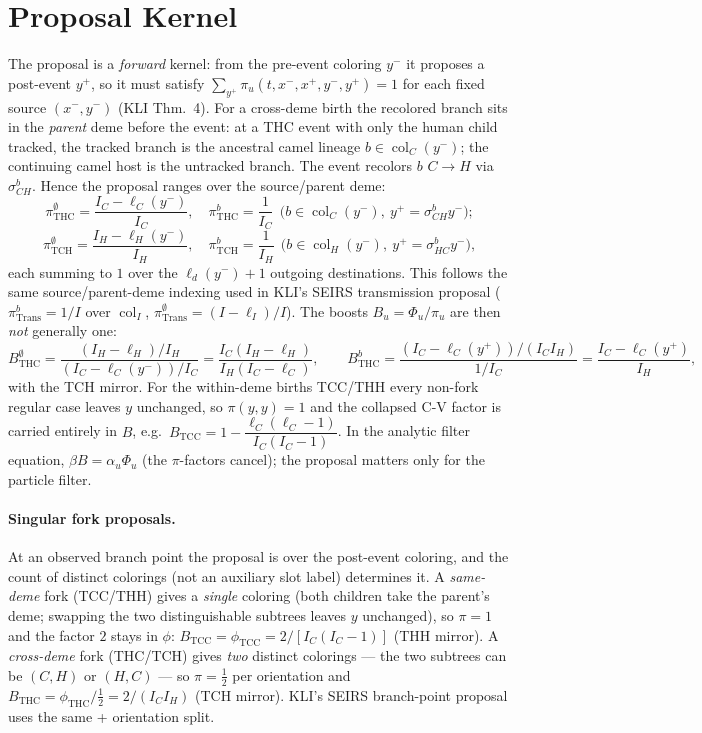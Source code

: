 \documentclass[11pt]{article}
\newcommand{\col}{\operatorname{col}}
\theoremstyle{plain}
\begin{document}
\section{Proposal Kernel}
The proposal is a \emph{forward} kernel: from the pre-event coloring $y^-$ it proposes a post-event
$y^+$, so it must satisfy $\sum_{y^+}\pi_u(t,x^-,x^+,y^-,y^+)=1$ for each fixed source $(x^-,y^-)$ (KLI
Thm.~4). For a cross-deme birth the recolored branch sits in the \emph{parent} deme before the event:
at a THC event with only the human child tracked, the tracked branch is the ancestral camel lineage
$b\in\col_C(y^-)$; the continuing camel host is the untracked branch. The event recolors $b$ $C\to H$ via $\sigma^b_{CH}$. Hence the proposal ranges over the source/parent deme:
\[
\pi^\emptyset_{\mathrm{THC}}=\frac{I_C-\ell_C(y^-)}{I_C},\quad
\pi^b_{\mathrm{THC}}=\frac{1}{I_C}\ \ \bigl(b\in\col_C(y^-),\ y^+=\sigma^b_{CH}y^-\bigr);
\]
\[
\pi^\emptyset_{\mathrm{TCH}}=\frac{I_H-\ell_H(y^-)}{I_H},\quad
\pi^b_{\mathrm{TCH}}=\frac{1}{I_H}\ \ \bigl(b\in\col_H(y^-),\ y^+=\sigma^b_{HC}y^-\bigr),
\]
each summing to $1$ over the $\ell_d(y^-)+1$ outgoing destinations. This follows the same source/parent-deme indexing used in KLI's SEIRS transmission proposal ($\pi^b_{\mathrm{Trans}}=1/I$ over $\col_I$, $\pi^\emptyset_{\mathrm{Trans}}=(I-\ell_I)/I$). The boosts $B_u=\Phi_u/\pi_u$ are
then \emph{not} generally one:
\[
B^\emptyset_{\mathrm{THC}}=\frac{(I_H-\ell_H)/I_H}{(I_C-\ell_C(y^-))/I_C}=\frac{I_C(I_H-\ell_H)}{I_H(I_C-\ell_C)},
\qquad
B^b_{\mathrm{THC}}=\frac{(I_C-\ell_C(y^+))/(I_CI_H)}{1/I_C}=\frac{I_C-\ell_C(y^+)}{I_H},
\]
with the TCH mirror. For the within-deme births TCC/THH every non-fork regular case leaves $y$
unchanged, so $\pi(y,y)=1$ and the collapsed C-V factor is carried entirely in $B$, e.g.\
$B_{\mathrm{TCC}}=1-\dfrac{\ell_C(\ell_C-1)}{I_C(I_C-1)}$. In the analytic filter equation, $\beta B=\alpha_u\Phi_u$
(the $\pi$-factors cancel); the proposal matters only for the particle filter.

\paragraph{Singular fork proposals.} At an observed branch point the proposal is over the post-event
coloring, and the count of distinct colorings (not an auxiliary slot label) determines it. A
\emph{same-deme} fork (TCC/THH) gives a \emph{single} coloring (both children take the parent's deme;
swapping the two distinguishable subtrees leaves $y$ unchanged), so $\pi=1$ and the factor $2$ stays in
$\phi$: $B_{\mathrm{TCC}}=\phi_{\mathrm{TCC}}=2/[I_C(I_C-1)]$ (THH mirror). A \emph{cross-deme} fork
(THC/TCH) gives \emph{two} distinct colorings --- the two subtrees can be $(C,H)$ or $(H,C)$ --- so
$\pi=\tfrac12$ per orientation and $B_{\mathrm{THC}}=\phi_{\mathrm{THC}}/\tfrac12=2/(I_CI_H)$ (TCH
mirror). KLI's SEIRS branch-point proposal uses the same \textonehalf{}+\textonehalf{} orientation split.
\end{document}
